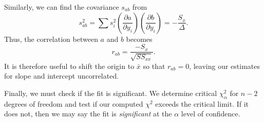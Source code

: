 Similarly, we can find the covariance $s_{ab}$ from
\begin{equation}
s^2_{ab} = \sum s ^2_i \left( \frac{\partial a}{\partial y_i} \right)
\left( \frac{\partial b}{\partial y_i}\right) = -\frac{S_x}{\Delta}.
\end{equation}
Thus, the correlation between $a$ and $b$ becomes
\begin{equation}
r_{ab} = \frac{-S_x}{\sqrt{SS_{xx}}}.
\end{equation}
It is therefore useful to shift the origin to $\bar{x}$ so that $r_{ab} = 0$, leaving our estimates for slope and intercept uncorrelated.  

	Finally, we must check if the fit is significant.  We determine 
critical $\chi ^2_\alpha$ for $n - 2$ degrees of freedom and test if our computed $\chi^2$ exceeds the critical limit.  If it 
does not, then we may say the fit is \emph{significant} at the $\alpha$ level of confidence.

